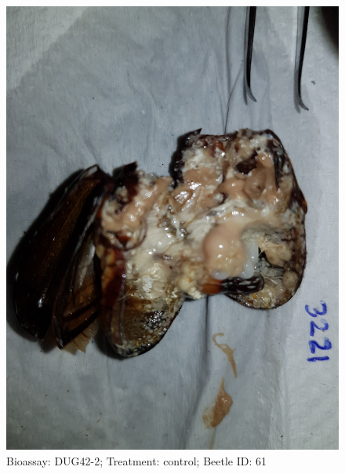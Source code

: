 \documentclass[11pt]{scrartcl}
\begin{document}
\begin{figure}[h!]
    \centering
    \includegraphics[width=\linewidth, height=\textheight, keepaspectratio]{uploads/btl.pm_image.a6e6336e68e00d61.447567343220333232315f5265702d3220636f6e74726f6c2e6a7067.jpg}
    \caption{Bioassay: DUG42-2; Treatment: control; Beetle ID: 61}
\end{figure}
\clearpage
\end{document}
